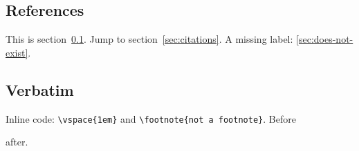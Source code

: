 \subsection{References}
\label{sec:refs}
This is section~\ref{sec:refs}.
Jump to section~\ref{sec:citations}.
A missing label: \ref{sec:does-not-exist}.

\subsection{Verbatim}
Inline code: \verb|\vspace{1em}| and \verb+\footnote{not a footnote}+.
Before  after.
